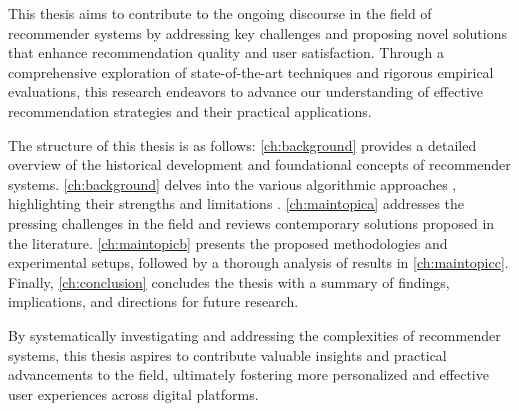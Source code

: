 This thesis aims to contribute to the ongoing discourse in the field of recommender systems by addressing key challenges and proposing novel solutions that enhance recommendation quality and user satisfaction. Through a comprehensive exploration of state-of-the-art techniques and rigorous empirical evaluations, this research endeavors to advance our understanding of effective recommendation strategies and their practical applications.

The structure of this thesis is as follows: \autoref{ch:background} provides a detailed overview of the historical development and foundational concepts of recommender systems. \autoref{ch:background} delves into the various algorithmic approaches \autocite{cormen:2001}, highlighting their strengths and limitations \autocite{knuth:1974}. \autoref{ch:maintopica} addresses the pressing challenges in the field and reviews contemporary solutions proposed in the literature. \autoref{ch:maintopicb} presents the proposed methodologies and experimental setups, followed by a thorough analysis of results in \autoref{ch:maintopicc}. Finally, \autoref{ch:conclusion} concludes the thesis with a summary of findings, implications, and directions for future research.

By systematically investigating and addressing the complexities of recommender systems, this thesis aspires to contribute valuable insights and practical advancements to the field, ultimately fostering more personalized and effective user experiences across digital platforms.